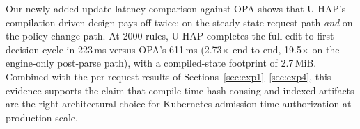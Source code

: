 
Our newly-added update-latency comparison against OPA shows that
U-HAP's compilation-driven design pays off twice: on the steady-state
request path \emph{and} on the policy-change path. At 2000 rules,
U-HAP completes the full edit-to-first-decision cycle in 223\,ms
versus OPA's 611\,ms (2.73$\times$ end-to-end, 19.5$\times$ on the
engine-only post-parse path), with a compiled-state footprint of
2.7\,MiB. Combined with the per-request results of
Sections~\ref{sec:exp1}--\ref{sec:exp4}, this evidence supports the
claim that compile-time hash consing and indexed artifacts are the
right architectural choice for Kubernetes admission-time
authorization at production scale.
